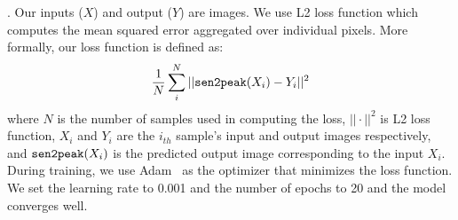 
. Our inputs ($X$) and output ($Y$) are images. We use L2 loss function which computes the mean squared error aggregated over individual pixels.
More formally, our loss function is  defined as:
\begin{equation}
 \frac{1}{N} \sum_{i}^{N} || \texttt{sen2peak}(X_i) - Y_i ||^2
 \label{equ:sen2peak_loss}
\end{equation}
where $N$ is the number of samples used in computing the loss, $|| \cdot ||^2$ is L2 loss function, $X_i$ and $Y_i$ are the $i_{th}$ sample's input and output images respectively, and $\texttt{sen2peak}(X_i)$ is the predicted output image corresponding to the input $X_i$. During training, we use 
Adam~\cite{kingma2017adam} as the optimizer that minimizes the loss function. We set the learning rate to 0.001 and the number of epochs to 20 and the model converges well.

